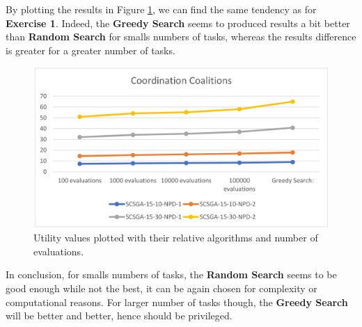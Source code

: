 \documentclass[10pt]{article}
\begin{document}
 By plotting the results in Figure \ref{fig:scsga_graph}, we can find the same tendency
  as for \textbf{Exercise 1}. Indeed, the \textbf{Greedy Search} seems to produced results
  a bit better than \textbf{Random Search} for smalls numbers of tasks, whereas the results
  difference is greater for a greater number of tasks.

 \begin{figure}[ht!]
 \includegraphics[width=\linewidth]{scsga_graph.png}
 \caption{Utility values plotted with their relative algorithms and number of evaluations.}
 \label{fig:scsga_graph}
 \end{figure}

In conclusion, for smalls numbers of tasks, the \textbf{Random Search} seems to be good
 enough while not the best, it can be again chosen for complexity or computational reasons.
 For larger number of tasks though, the \textbf{Greedy Search} will be better and better,
 hence should be privileged.   
\end{document}
